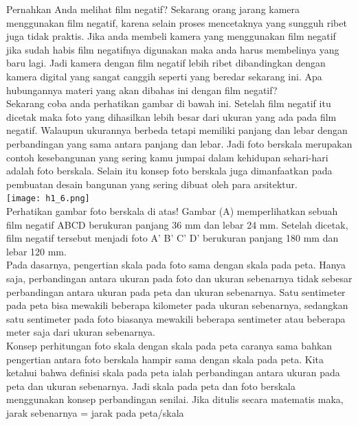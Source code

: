 \documentclass[11pt,fleqn]{book} %
\begin{document}
Pernahkan Anda melihat film negatif? Sekarang orang jarang kamera menggunakan film negatif, karena selain proses mencetaknya yang sungguh ribet juga tidak praktis. Jika anda membeli kamera yang menggunakan film negatif jika sudah habis film negatifnya digunakan maka anda harus membelinya yang baru lagi. Jadi kamera dengan film negatif lebih ribet dibandingkan dengan kamera digital yang sangat canggih seperti yang beredar sekarang ini. Apa hubungannya materi yang akan dibahas ini dengan film negatif?\\

Sekarang coba anda perhatikan gambar di bawah ini. Setelah film negatif itu dicetak maka foto yang dihasilkan lebih besar dari ukuran yang ada pada film negatif. Walaupun ukurannya berbeda tetapi memiliki panjang dan lebar dengan perbandingan yang sama antara panjang dan lebar. Jadi foto berskala merupakan contoh kesebangunan yang sering kamu jumpai dalam kehidupan sehari-hari adalah foto berskala. Selain itu konsep foto berskala juga dimanfaatkan pada pembuatan desain bangunan yang sering dibuat oleh para arsitektur.\\

 \texttt{[image: h1\_6.png]}\\
Perhatikan gambar foto berskala di atas! Gambar (A) memperlihatkan sebuah film negatif ABCD berukuran panjang 36 mm dan lebar 24 mm. Setelah dicetak, film negatif tersebut menjadi foto A' B' C' D' berukuran panjang 180 mm dan lebar 120 mm.\\

Pada dasarnya, pengertian skala pada foto sama dengan skala pada peta. Hanya saja, perbandingan antara ukuran pada foto dan ukuran sebenarnya tidak sebesar perbandingan antara ukuran pada peta dan ukuran sebenarnya. Satu sentimeter pada peta bisa mewakili beberapa kilometer pada ukuran sebenarnya, sedangkan satu sentimeter pada foto biasanya mewakili beberapa sentimeter atau beberapa meter saja dari ukuran sebenarnya.\\

Konsep perhitungan foto skala dengan skala pada peta caranya sama bahkan pengertian antara foto berskala hampir sama dengan skala pada peta. Kita ketahui bahwa definisi skala pada peta ialah perbandingan antara ukuran pada peta dan ukuran sebenarnya. Jadi skala pada peta dan foto berskala menggunakan konsep perbandingan senilai. Jika ditulis secara matematis maka, jarak sebenarnya = jarak pada peta/skala\\
\end{document}
